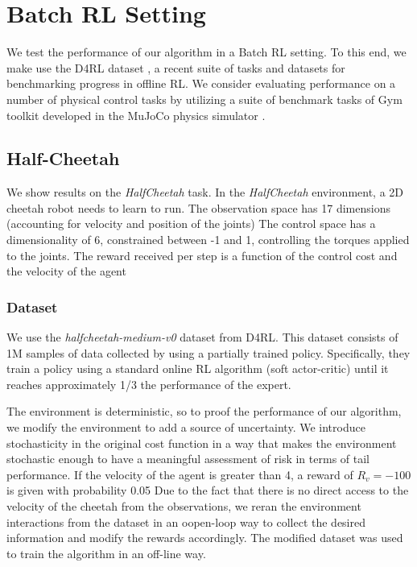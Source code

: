 
\section{Batch RL Setting}
We test the performance of our algorithm in a Batch RL setting.
To this end, we make use the D4RL dataset \cite{d4rl}, a recent suite of tasks and datasets for
benchmarking progress in offline RL.
We consider evaluating performance on a number of physical control tasks by utilizing
a suite of benchmark tasks of Gym toolkit developed in the MuJoCo
physics simulator \citep{Todorov2012}.

\subsection{Half-Cheetah}
We show results on the \textit{HalfCheetah} task.
In the \textit{HalfCheetah} environment, a 2D cheetah robot needs to learn to run.
The observation space has 17 dimensions (accounting for velocity and position of the joints)
The control space has a dimensionality of 6, constrained between -1 and 1, 
controlling the torques applied to the joints.
The reward received per step is a function of the control cost and the velocity of the agent

\subsubsection{Dataset}
We use the \textit{halfcheetah-medium-v0} dataset from D4RL. This dataset consists of 1M samples 
of data collected by using a partially trained policy. Specifically, they train a policy
using a standard online RL algorithm (soft actor-critic) until it reaches 
approximately 1/3 the performance of the expert.

The environment is deterministic, so to proof the performance of our algorithm, we modify the environment to
add a source of uncertainty. We introduce stochasticity in the original cost function in a way that 
makes the environment stochastic enough to have a meaningful assessment of risk in terms of 
tail performance.
If the velocity of the agent is greater than 4, a reward of $R_v=-100$ is given with probability 0.05 
Due to the fact that there is no direct access to the velocity of the cheetah from the observations,
we reran the environment interactions from the dataset in an oopen-loop way to collect the desired information and 
modify the rewards accordingly.
The modified dataset was used to train the algorithm in an off-line way.


